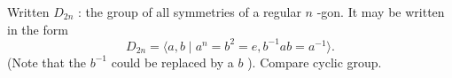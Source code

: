 Written  $ D_{2n} $ : the group of all
symmetries of a regular  $ n $ -gon.  It may be written in the
form
 \[ D_{2n}= \langle a,b  \mid a^n=b^2=e,  b ^{-1} ab=a ^{-1}  \rangle. \]
(Note that the  $ b ^{-1} $  could be replaced by a  $ b $ ).
Compare cyclic group.


